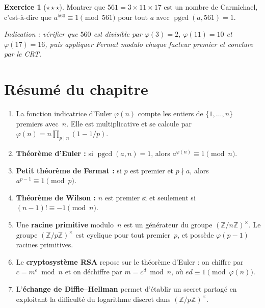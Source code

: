 \documentclass[12pt,a4paper,openany]{book}
\theoremstyle{definition}
\newtheorem{exercice}{Exercice}[chapter]
\theoremstyle{plain}
\theoremstyle{remark}
\newcommand{\Z}{\mathbb{Z}}
\DeclareMathOperator{\pgcd}{pgcd}
\begin{document}
\begin{exercice}[$\star\star\star$]
\label{exo:few-13}
Montrer que $561 = 3 \times 11 \times 17$ est un nombre de Carmichael, c'est-à-dire
que $a^{560} \equiv 1 \pmod{561}$ pour tout $a$ avec $\pgcd(a, 561) = 1$.

\emph{Indication : vérifier que $560$ est divisible par $\varphi(3) = 2$,
$\varphi(11) = 10$ et $\varphi(17) = 16$, puis appliquer Fermat modulo chaque
facteur premier et conclure par le CRT.}
\end{exercice}

\section*{Résumé du chapitre}
\label{sec:few-resume}

\begin{enumerate}
  \item La fonction indicatrice d'Euler $\varphi(n)$ compte les entiers de $\{1, \ldots, n\}$
    premiers avec~$n$. Elle est multiplicative et se calcule par
    $\varphi(n) = n \prod_{p \mid n} (1 - 1/p)$.
  \item \textbf{Théorème d'Euler :} si $\pgcd(a, n) = 1$, alors
    $a^{\varphi(n)} \equiv 1 \pmod{n}$.
  \item \textbf{Petit théorème de Fermat :} si $p$ est premier et $p \nmid a$,
    alors $a^{p-1} \equiv 1 \pmod{p}$.
  \item \textbf{Théorème de Wilson :} $n$ est premier si et seulement si
    $(n-1)! \equiv -1 \pmod{n}$.
  \item Une \textbf{racine primitive} modulo~$n$ est un générateur du groupe
    $(\Z/n\Z)^\times$. Le groupe $(\Z/p\Z)^\times$ est cyclique pour tout
    premier~$p$, et possède $\varphi(p-1)$ racines primitives.
  \item Le \textbf{cryptosystème RSA} repose sur le théorème d'Euler : on chiffre
    par $c = m^e \bmod n$ et on déchiffre par $m = c^d \bmod n$, où
    $ed \equiv 1 \pmod{\varphi(n)}$.
  \item L'\textbf{échange de Diffie--Hellman} permet d'établir un secret partagé
    en exploitant la difficulté du logarithme discret dans $(\Z/p\Z)^\times$.
\end{enumerate}

\end{document}
